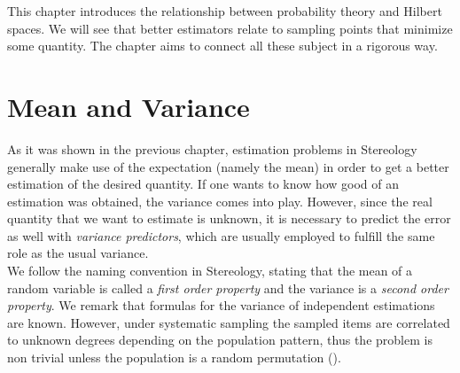 

This chapter introduces the relationship between probability theory
and Hilbert spaces. We will see that better estimators relate to sampling points that minimize some quantity. The chapter aims to connect all these subject in a rigorous way.
\section{Mean and Variance}
As it was shown in the previous chapter, estimation problems in Stereology generally make use of the expectation (namely the mean) in order to get a better estimation of the desired quantity. If one wants to know how good of an estimation was obtained, the variance comes into play. However, since the real quantity that we want to estimate is unknown, 
it is necessary to predict the error as well with \textit{variance predictors}, which are usually employed to fulfill the same role as the usual variance.\\

We follow the naming convention in Stereology, stating that the mean of a random variable is called a \textit{first order property} and the variance is a \textit{second order property}. We remark that formulas for the variance of %
independent estimations are known. However, under systematic sampling the sampled items are correlated to unknown degrees depending on the population pattern, thus the problem is non trivial unless the
population is a random permutation (\cite{CO.IAS.17.Hist.pdf}).\\

